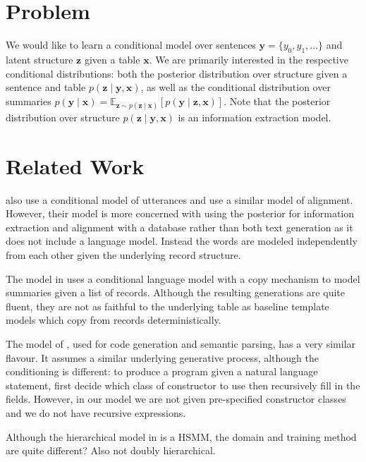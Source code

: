 \documentclass{article}
\newcommand\Es[2]{\mathbb{E}_{#1}\left[#2\right]}
\newcommand{\bx}{\mathbf{x}}
\newcommand{\by}{\mathbf{y}}
\newcommand{\bz}{\mathbf{z}}
\begin{document}

\section{Problem}
We would like to learn a conditional model
over sentences $\by = \{y_0, y_1, \ldots\}$ and latent structure $\bz$ given a table $\bx$.
We are primarily interested in the respective conditional distributions:
both the posterior distribution over structure given a sentence and table $p(\bz\mid\by,\bx)$,
as well as the conditional distribution over summaries
$p(\by\mid\bx)=\Es{\bz\sim p(\bz\mid\bx)}{p(\by\mid\bz,\bx)}$.
Note that the posterior distribution over structure $p(\bz\mid\by,\bx)$
is an information extraction model.

\section{Related Work}
\citet{liang2009semalign} also use a conditional model of utterances and use a similar model of alignment.
However, their model is more concerned with using the posterior for information extraction and 
alignment with a database rather than both text generation as it does not include a language model. 
Instead the words are modeled independently from each other given the underlying record structure.

The model in \citet{wiseman2017d2t} uses a conditional language model with a copy mechanism
to model summaries given a list of records.
Although the resulting generations are quite fluent, they are not
as faithful to the underlying table as baseline template models which copy from
records deterministically.

The model of \citet{rabinovich17codegen}, used for code generation and semantic parsing,
has a very similar flavour.
It assumes a similar underlying generative process, although the conditioning is different:
to produce a program given a natural language statement,
first decide which class of constructor to use then recursively fill in the fields.
However, in our model we are not given pre-specified constructor classes and
we do not have recursive expressions.

Although the hierarchical model in \citet{yarats2017dialogue} is a HSMM,
the domain and training method are quite different?
Also not doubly hierarchical. %
\end{document}
